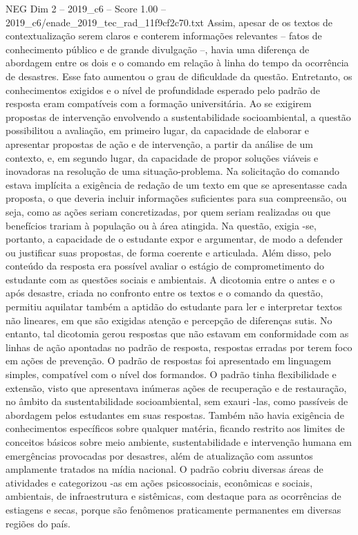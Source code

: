 \begin{textsample}{NEG Dim 2 – 2019\_c6 – Score 1.00 – 2019\_c6/enade\_2019\_tec\_rad\_11f9cf2c70.txt}
Assim, apesar de os textos de contextualização serem claros e conterem informações relevantes – fatos de conhecimento público e de grande divulgação –, havia uma diferença de abordagem entre os dois e o comando em relação à linha do tempo da ocorrência de desastres.
Esse fato aumentou o grau de dificuldade da questão.
Entretanto, os conhecimentos exigidos e o nível de profundidade esperado pelo padrão de resposta eram compatíveis com a formação universitária.
Ao se exigirem propostas de intervenção envolvendo a sustentabilidade socioambiental, a questão possibilitou a avaliação, em primeiro lugar, da capacidade de elaborar e apresentar propostas de ação e de intervenção, a partir da análise de um contexto, e, em segundo lugar, da capacidade de propor soluções viáveis e inovadoras na resolução de uma situação-problema.
Na solicitação do comando estava implícita a exigência de redação de um texto em que se apresentasse cada proposta, o que deveria incluir informações suficientes para sua compreensão, ou seja, como as ações seriam concretizadas, por quem seriam realizadas ou que benefícios trariam à população ou à área atingida.
Na questão, exigia -se, portanto, a capacidade de o estudante expor e argumentar, de modo a defender ou justificar suas propostas, de forma coerente e articulada.
Além disso, pelo conteúdo da resposta era possível avaliar o estágio de comprometimento do estudante com as questões sociais e ambientais.
A dicotomia entre o antes e o após desastre, criada no confronto entre os textos e o comando da questão, permitiu aquilatar também a aptidão do estudante para ler e interpretar textos não lineares, em que são exigidas atenção e percepção de diferenças sutis.
No entanto, tal dicotomia gerou respostas que não estavam em conformidade com as linhas de ação apontadas no padrão de resposta, respostas erradas por terem foco em ações de prevenção.
O padrão de respostas foi apresentado em linguagem simples, compatível com o nível dos formandos.
O padrão tinha flexibilidade e extensão, visto que apresentava inúmeras ações de recuperação e de restauração, no âmbito da sustentabilidade socioambiental, sem exauri -las, como passíveis de abordagem pelos estudantes em suas respostas.
Também não havia exigência de conhecimentos específicos sobre qualquer matéria, ficando restrito aos limites de conceitos básicos sobre meio ambiente, sustentabilidade e intervenção humana em emergências provocadas por desastres, além de atualização com assuntos amplamente tratados na mídia nacional.
O padrão cobriu diversas áreas de atividades e categorizou -as em ações psicossociais, econômicas e sociais, ambientais, de infraestrutura e sistêmicas, com destaque para as ocorrências de estiagens e secas, porque são fenômenos praticamente permanentes em diversas regiões do país.

\end{textsample}
